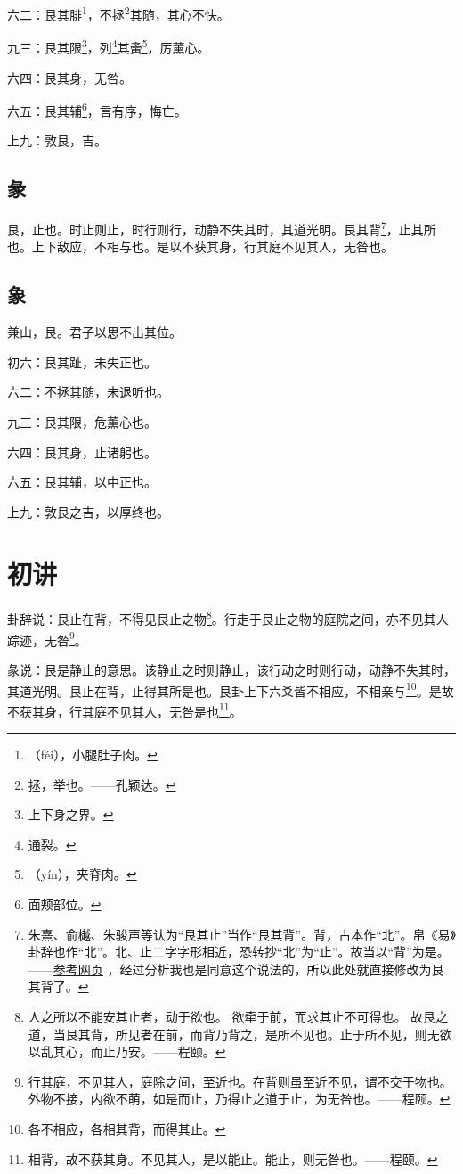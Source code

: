 \documentclass[12pt,oneside]{book}
\begin{document}
六二：艮其腓\footnote{（féi），小腿肚子肉。}，不拯\footnote{拯，举也。——孔颖达。}其随，其心不快。

九三：艮其限\footnote{上下身之界。}，列\footnote{通裂。}其夤\footnote{（yín），夹脊肉。}，厉薰心。

六四：艮其身，无咎。

六五：艮其辅\footnote{面颊部位。}，言有序，悔亡。

上九：敦艮，吉。


\subsection{彖}
艮，止也。时止则止，时行则行，动静不失其时，其道光明。艮其背\footnote{朱熹、俞樾、朱骏声等认为“艮其止”当作“艮其背”。背，古本作“北”。帛《易》卦辞也作“北”。北、止二字字形相近，恐转抄“北”为“止”。故当以“背”为是。——\href{https://www.vsucai.cn/yizhuan/content-52.html}{参考网页} ，经过分析我也是同意这个说法的，所以此处就直接修改为艮其背了。}，止其所也。上下敌应，不相与也。是以不获其身，行其庭不见其人，无咎也。

\subsection{象}
兼山，艮。君子以思不出其位。

初六：艮其趾，未失正也。

六二：不拯其随，未退听也。

九三：艮其限，危薰心也。

六四：艮其身，止诸躬也。

六五：艮其辅，以中正也。

上九：敦艮之吉，以厚终也。

\section{初讲}
卦辞说：艮止在背，不得见艮止之物\footnote{人之所以不能安其止者，动于欲也。 欲牵于前，而求其止不可得也。 故艮之道，当艮其背，所见者在前，而背乃背之，是所不见也。止于所不见，则无欲以乱其心，而止乃安。——程颐。}。行走于艮止之物的庭院之间，亦不见其人踪迹，无咎\footnote{行其庭，不见其人，庭除之间，至近也。在背则虽至近不见，谓不交于物也。外物不接，内欲不萌，如是而止，乃得止之道于止，为无咎也。——程颐。}。

彖说：艮是静止的意思。该静止之时则静止，该行动之时则行动，动静不失其时，其道光明。艮止在背，止得其所是也。艮卦上下六爻皆不相应，不相亲与\footnote{各不相应，各相其背，而得其止。}。是故不获其身，行其庭不见其人，无咎是也\footnote{相背，故不获其身。不见其人，是以能止。能止，则无咎也。——程颐。}。
\end{document}
